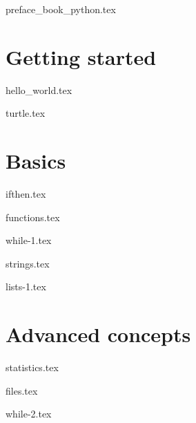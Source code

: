 \documentclass[10pt,twoside,openright]{report}
\begin{document}

{preface_book_python.tex}
\debutchapitres
{}


\clearemptydoublepage


\part{Getting started}

{hello_world.tex}

{turtle.tex}


\clearemptydoublepage



\part{Basics}

{ifthen.tex}

{functions.tex}

{while-1.tex}

{strings.tex}

{lists-1.tex}


\clearemptydoublepage


\part{Advanced concepts}

{statistics.tex}

{files.tex}

{while-2.tex}
\end{document}
